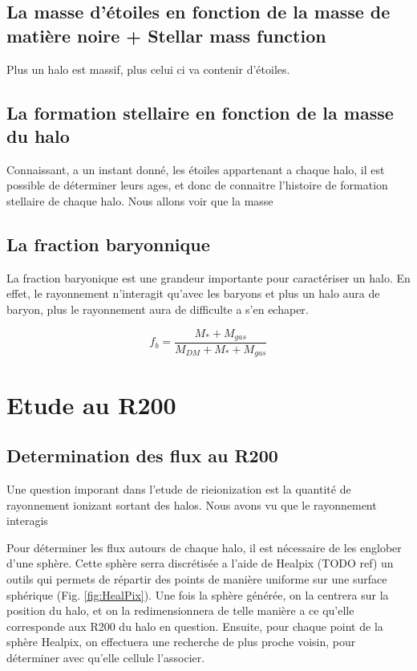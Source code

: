 \subsection{La masse d'étoiles en fonction de la masse de matière noire + Stellar mass function}
Plus un halo est massif, plus celui ci va contenir d'étoiles.



\subsection{La formation stellaire en fonction de la masse du halo}
Connaissant, a un instant donné, les étoiles appartenant a chaque halo, il est possible de déterminer leurs ages, et donc de connaitre l'histoire de formation stellaire de chaque halo.
Nous allons voir que la masse 

\subsection{La fraction baryonnique}
La fraction baryonique est une grandeur importante pour caractériser un halo.
En effet, le rayonnement n'interagit qu'avec les baryons et plus un halo aura de baryon, plus le rayonnement aura de difficulte a s'en echaper.

\begin{equation}
f_b = \frac{M_* + M_{gas} }{M_{DM} + M_* + M_{gas} }
\end{equation}




\section{Etude au R200}


\subsection{Determination des flux au R200}
\label{sec:healpix}


Une question imporant dans l'etude de rieionization est la quantité de rayonnement ionizant sortant des halos.
Nous avons vu que le rayonnement interagis 


Pour déterminer les flux autours de chaque halo, il est nécessaire de les englober d'une sphère.
Cette sphère serra discrétisée a l'aide de Healpix (TODO ref) un outils qui permets de répartir des points de manière uniforme sur une surface sphérique (Fig. \ref{fig:HealPix}).
Une fois la sphère générée, on la centrera sur la position du halo, et on la redimensionnera de telle manière a ce qu'elle corresponde aux R200 du halo en question.
Ensuite, pour chaque point de la sphère Healpix, on effectuera une recherche de plus proche voisin, pour déterminer avec qu'elle cellule l'associer.

